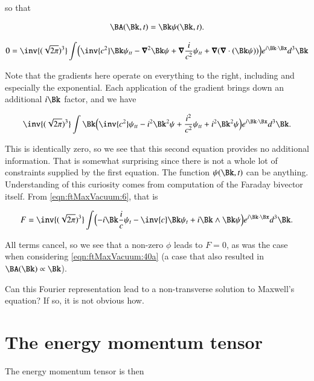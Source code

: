so that

\begin{align}\label{eqn:ftMaxVacuum:77}
\BA(\Bk, t) = \Bk \psi(\Bk, t).
\end{align}

\begin{align*}
0 
&=
\inv{(\sqrt{2 \pi})^3} \int 
\Bigl(
\inv{c^2} \Bk \psi_{tt}
- \spacegrad^2 \Bk \psi 
+ \spacegrad \frac{i}{c^2} \psi_{tt}
+\spacegrad( \spacegrad \cdot (\Bk \psi) )
\Bigr)
e^{i \Bk \cdot \Bx } d^3 \Bk \\
\end{align*}

Note that the gradients here operate on everything to the right, including and especially the exponential.  Each application of the gradient brings down an additional $i\Bk$ factor, and we have

\begin{align*}
\inv{(\sqrt{2 \pi})^3} \int 
\Bk \Bigl(
\inv{c^2} \psi_{tt}
- i^2 \Bk^2 \psi 
+ \frac{i^2}{c^2} \psi_{tt}
+i^2 \Bk^2 \psi 
\Bigr)
e^{i \Bk \cdot \Bx } d^3 \Bk.
\end{align*}

This is identically zero, so we see that this second equation provides no additional information.  That is somewhat surprising since there is not a whole lot of constraints supplied by the first equation.  The function $\psi(\Bk, t)$ can be anything.  Understanding of this curiosity comes from computation of the Faraday bivector itself.  From \autoref{eqn:ftMaxVacuum:6}, that is

\begin{align}\label{eqn:ftMaxVacuum:78}
F = 
\inv{(\sqrt{2 \pi})^3} \int 
\Bigl(
-i \Bk \frac{i}{c}\psi_t - \inv{c} \Bk \psi_t + i \Bk \wedge \Bk \psi
\Bigr)
e^{i \Bk \cdot \Bx } d^3 \Bk.
\end{align}

All terms cancel, so we see that a non-zero $\phi$ leads to $F = 0$, as was the case when considering \autoref{eqn:ftMaxVacuum:40a} (a case that also resulted in $\BA(\Bk) \propto \Bk$).

Can this Fourier representation lead to a non-transverse solution to Maxwell's equation?  If so, it is not obvious how.

\section{The energy momentum tensor}

The energy momentum tensor is then

